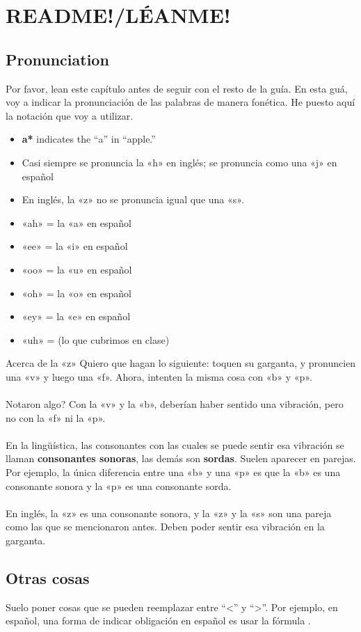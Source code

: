\chapter{README!/\textexclamdown LÉANME!}

\section{Pronunciation}
Por favor, lean este cap\'itulo antes de seguir con el resto de la gu\'ia.
En esta gu\'a, voy a indicar la pronunciaci\'on de las palabras de manera fon\'etica.
He puesto aquí la notaci\'on que voy a utilizar.


\begin{itemize}
	\item \textbf{a*} indicates the ``a'' in ``apple.''
	\item Casi siempre se pronuncia la «h» en inglés;
			se pronuncia como una «j» en espa\~nol
	\item En inglés, la «z» no se pronuncia igual que una «s».
	\item «ah» = la «a» en espa\~nol
	\item «ee» = la «i» en espa\~nol
	\item «oo» = la «u» en espa\~nol
	\item «oh» = la «o» en espa\~nol
	\item «ey» = la «e» en espa\~nol
	\item «uh» =  (lo que cubrimos en clase)
\end{itemize}

\begin{conf}{Acerca de la «z»}
Quiero que hagan lo siguiente: toquen su garganta, y pronuncien una «v» y luego una «f».
	Ahora, intenten la misma cosa con «b» y «p».\\
\\
\textquestiondown Notaron algo? Con la «v» y la «b», deber\'ian haber
	sentido una vibraci\'on, pero no con la «f» ni la «p». \\
\\
En la ling\"u\'istica, las consonantes con las cuales se puede sentir esa vibraci\'on
	se llaman \textbf{consonantes sonoras}, las dem\'as son \textbf{sordas}. Suelen
	aparecer en parejas. Por ejemplo, la \'unica diferencia entre una «b» y una «p» es
	que la «b» es una consonante sonora y la «p» es una consonante sorda.\\
\\
En ingl\'es, la «z» es una consonante sonora, y la «z» y la «s» son una pareja como las que se mencionaron antes. Deben poder sentir esa vibraci\'on en la garganta.
\end{conf}

\section{Otras cosas}

Suelo poner cosas que se pueden reemplazar entre ``<'' y ``>''.
Por ejemplo, en español, una forma de indicar obligación en español es usar
la fórmula .
